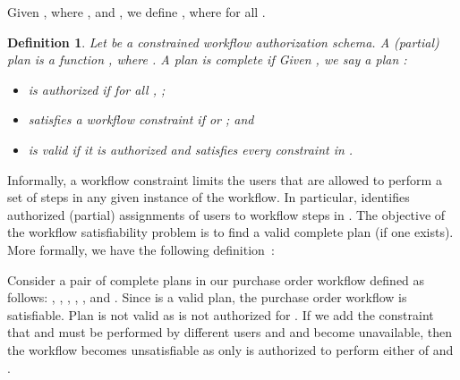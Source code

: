 \documentclass[jcs,crcready]{iosart1c}
\newtheorem{df}{Definition}
\begin{document}
Given , where , and , we define , where  for all .

\begin{df}
Let  be a constrained workflow authorization schema.
A \emph{(partial) plan} is a function , where . A plan  is \emph{complete} if 
Given , we say a plan : 
\begin{itemize}
 \item is \emph{authorized} if for all , ;
 \item \emph{satisfies} a workflow constraint  if  or ; and
 \item is \emph{valid} if it is authorized and satisfies every constraint in .
\end{itemize}
\end{df}

Informally, a workflow constraint  limits the users that are allowed to perform a set of steps  in any given instance of the workflow.
In particular,  identifies authorized (partial) assignments of users to workflow steps in .
The objective of the workflow satisfiability problem is to find a valid complete plan (if one exists).
More formally, we have the following definition~\cite{WaLi10}:

\begin{center}
\end{center}

Consider a pair  of  complete plans in our purchase order workflow defined as follows: ,  , , ,  , and . Since  is a valid plan, the purchase order workflow is satisfiable. Plan  is not valid as  is not authorized for . If we add the constraint that  and  must be performed by different users and
 and  become unavailable, then the workflow becomes unsatisfiable as only  is authorized to perform either of  and .
\end{document}
